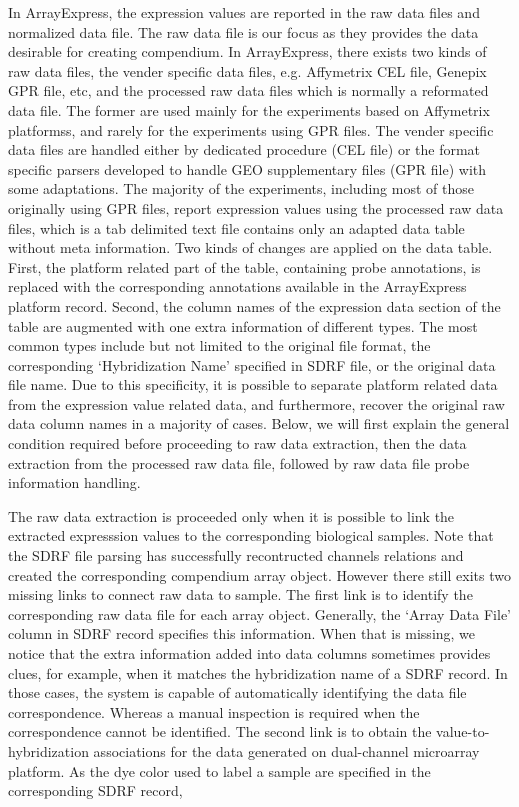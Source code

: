 In ArrayExpress, the expression values are reported in the raw data files
and normalized data file.
%
The raw data file is our focus as they provides the data desirable for
creating compendium.
%
In ArrayExpress, there exists two kinds of raw data files, the vender
specific data files, e.g. Affymetrix CEL file, Genepix GPR file, etc, and
the processed raw data files which is normally a reformated data file.
%
The former are used mainly for the experiments based on Affymetrix
platformss, and rarely for the experiments using GPR files.
%
The vender specific data files are handled either by dedicated procedure
(CEL file) or the format specific parsers developed to handle GEO
supplementary files (GPR file) with some adaptations.
%
The majority of the experiments, including most of those originally using
GPR files, report expression values using the processed raw data files,
which is a tab delimited text file contains only an adapted data table
without meta information.
%
Two kinds of changes are applied on the data table.  First, the platform
related part of the table, containing probe annotations, is replaced with
the corresponding annotations available in the ArrayExpress platform record.
%
Second, the column names of the expression data section of the table are
augmented with one extra information of different types.  The most common
types include but not limited to the original file format, the corresponding
`Hybridization Name' specified in SDRF file, or the original data file name.
%
Due to this specificity, it is possible to separate platform related data
from the expression value related data, and furthermore, recover the
original raw data column names in a majority of cases.
%
Below, we will first explain the general condition required before
proceeding to raw data extraction, then the data extraction from the
processed raw data file, followed by raw data file probe information
handling.


The raw data extraction is proceeded only when it is possible to link the
extracted expresssion values to the corresponding biological samples.
%
Note that the SDRF file parsing has successfully recontructed channels
relations and created the corresponding compendium array object.
%
However there still exits two missing links to connect raw data to sample.
%
The first link is to identify the corresponding raw data file for each array
object.  Generally, the `Array Data File' column in SDRF record specifies
this information.
%
When that is missing, we notice that the extra information added into data
columns sometimes provides clues, for example, when it matches the
hybridization name of a SDRF record.
%
In those cases, the system is capable of automatically identifying the data
file correspondence.
%
Whereas a manual inspection is required when the correspondence cannot be
identified.
%
The second link is to obtain the value-to-hybridization associations for the
data generated on dual-channel microarray platform.
%
As the dye color used to label a sample are specified in the corresponding
SDRF record, 



